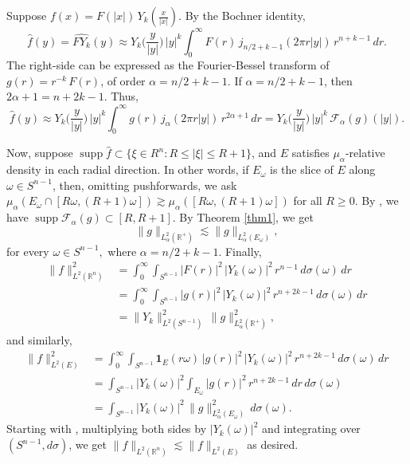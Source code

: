 \documentclass[11pt,a4paper,reqno,dvipsnames]{amsart}
\newcommand{\F}{\mathcal{F}}
\newcommand{\R}{\mathbb R}
\renewcommand{\ge}{\geqslant}
\renewcommand{\le}{\leqslant}
\numberwithin{equation}{section}
\theoremstyle{plain}
\theoremstyle{definition}
\theoremstyle{remark}
\begin{document}
    Suppose $f(x) = F(|x|) \,Y_k\left(\frac{x}{|x|} \right)$. By the Bochner identity,
\begin{equation}
\label{bochner-1}
    \widehat{f}(y) = \widehat{FY_k}(y) \approx Y_k\bigg(\frac{y}{|y|}\bigg)\, |y|^k \int_0^\infty F(r)\, j_{n/2 + k - 1}(2\pi r|y|)\, r^{n+k-1}\, dr.
\end{equation}
The right-side can be expressed as the Fourier-Bessel transform of $g(r) = r^{-k}\, F(r)$, of order $\alpha = n/2 + k -1$. If $\alpha = n/2 + k - 1$, then $2\alpha + 1 = n + 2k - 1$. Thus,
\begin{equation}
\label{bochner-2}
    \widehat{f}(y) \approx  Y_k\bigg(\frac{y}{|y|}\bigg)\, |y|^k \int_0^\infty g(r)\, j_{\alpha}(2\pi r|y|)\, r^{2\alpha +1}\, dr =  Y_k\bigg(\frac{y}{|y|}\bigg)\, |y|^k\, \F_\alpha(g)(|y|).
\end{equation}

Now, suppose $\operatorname{supp} \widehat{f} \subset \{\xi \in R^n: R \le |\xi| \le R+1\}$, and $E$ satisfies $\mu_\alpha$-relative density in each radial direction. In other words, if $E_\omega$ is the slice of $E$ along $\omega\in S^{n-1}$, then, omitting pushforwards, we ask $\mu_\alpha (E_\omega \cap [R\omega,(R+1)\omega]) \gtrsim \mu_\alpha([R\omega, (R+1)\omega])$ for all $R \ge 0$. By , we have $\operatorname{supp} \F_\alpha(g) \subset [R,R+1]$. By Theorem \ref{thm1}, we get 
\begin{equation}
    \label{bochner-3}
    \|g\|_{L^2_\alpha(\R^+)} \lesssim \|g\|_{L^2_\alpha(E_\omega)},
\end{equation}
for every $\omega \in S^{n-1},$ where $\alpha = n/2 + k - 1$. Finally,
\begin{align*}
    \|f\|_{L^2(\R^n)}^2 &= \int_{0}^\infty \int_{S^{n-1}} |F(r)|^2\, |Y_k(\omega)|^2 \, r^{n-1}\, d\sigma(\omega) \, dr\\ 
    &= \int_{0}^\infty \int_{S^{n-1}} |g(r)|^2\, |Y_k(\omega)|^2 \, r^{n+2k-1}\, d\sigma(\omega) \, dr\\
    &= \|Y_k\|^2_{L^2(S^{n-1})}\, \|g\|_{L^2_\alpha(\R^+)}^2,
\end{align*}
and similarly, 
\begin{align*}
    \|f\|^2_{L^2(E)} &=  \int_{0}^\infty \int_{S^{n-1}} \mathbf{1}_{E}(r\omega)\, |g(r)|^2\, |Y_k(\omega)|^2 \, r^{n+2k-1}\, d\sigma(\omega) \, dr\\
    &= \int_{S^{n-1}} |Y_k(\omega)|^2 \int_{E_\omega} |g(r)|^2\, r^{n+2k-1}\, dr\, d\sigma(\omega)\\
    &= \int_{S^{n-1}} |Y_k(\omega)|^2\, \|g\|^{2}_{L^2_\alpha(E_\omega)}\, d\sigma(\omega).
\end{align*}
Starting with , multiplying both sides by $|Y_k(\omega)|^2$ and integrating over $(S^{n-1}, d\sigma)$, we get $\|f\|_{L^2(\R^n)} \lesssim \|f\|_{L^2(E)}$ as desired.
\end{document}
